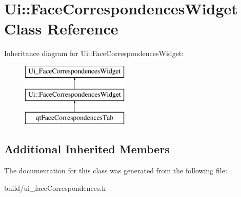 \hypertarget{class_ui_1_1_face_correspondences_widget}{}\section{Ui\+:\+:Face\+Correspondences\+Widget Class Reference}
\label{class_ui_1_1_face_correspondences_widget}
Inheritance diagram for Ui\+:\+:Face\+Correspondences\+Widget\+:\begin{figure}[H]
\begin{center}
\leavevmode
\includegraphics[height=3.000000cm]{class_ui_1_1_face_correspondences_widget}
\end{center}
\end{figure}
\subsection*{Additional Inherited Members}


The documentation for this class was generated from the following file\+:\begin{DoxyCompactItemize}
\item 
build/ui\+\_\+face\+Correspondences.\+h\end{DoxyCompactItemize}

